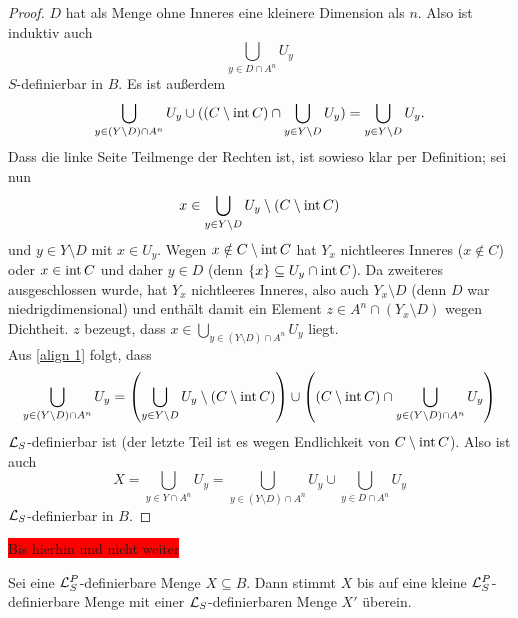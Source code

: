 \begin{proof}
	$D$ hat als Menge ohne Inneres eine kleinere Dimension als $n$. Also ist induktiv auch $$\bigcup\limits_{y\in D\cap A^n}U_y$$ $S$-definierbar in $B$. Es ist außerdem
	\begin{align}\label{align 1}
	\bigcup\limits_{y\in (Y\setminus D)\cap A^n}U_y\cup((C\setminus\operatorname{int} C)\cap\bigcup\limits_{y\in Y\setminus D}U_y)=\bigcup\limits_{y\in Y\setminus D}U_y.
	\end{align}
	Dass die linke Seite Teilmenge der Rechten ist, ist sowieso klar per Definition; sei nun $$x\in\bigcup\limits_{y\in Y\setminus D}U_y\setminus (C\setminus\operatorname{int} C)$$ und $y\in Y\setminus D$ mit $x\in U_y$. Wegen $x\notin C\setminus\operatorname{int} C$ hat $Y_x$ nichtleeres Inneres ($x\notin C$) oder $x\in\operatorname{int} C$ und daher $y\in D$ (denn $\{x\}\subseteq U_y\cap\operatorname{int} C$). Da zweiteres ausgeschlossen wurde, hat $Y_x$ nichtleeres Inneres, also auch $Y_x\setminus D$ (denn $D$ war niedrigdimensional) und enthält damit ein Element $z\in A^n\cap(Y_x\setminus D)$ wegen Dichtheit. $z$ bezeugt, dass $x\in\bigcup\limits_{y\in (Y\setminus D)\cap A^n}U_y$ liegt.\\
	Aus \ref{align 1} folgt, dass $$\bigcup\limits_{y\in (Y\setminus D)\cap A^n}U_y=\left(\bigcup\limits_{y\in Y\setminus D}U_y\setminus(C\setminus\operatorname{int} C)\right)\cup\left((C\setminus\operatorname{int} C)\cap\bigcup\limits_{y\in (Y\setminus D)\cap A^n}U_y\right)$$ $\mathcal{L}_S$-definierbar ist (der letzte Teil ist es wegen Endlichkeit von $C\setminus\operatorname{int} C$). Also ist auch $$X=\bigcup\limits_{y\in Y\cap A^n}U_y=\bigcup\limits_{y\in (Y\setminus D)\cap A^n}U_y\cup\bigcup\limits_{y\in D\cap A^n}U_y$$ $\mathcal{L}_S$-definierbar in $B$.
\end{proof}
\colorbox{red}{Bis hierhin und nicht weiter}
\begin{theorem}
	Sei eine $\mathcal{L}^P_S$-definierbare Menge $X\subseteq B$. Dann stimmt $X$ bis auf eine kleine $\mathcal{L}^P_S$-definierbare Menge mit einer $\mathcal{L}_S$-definierbaren Menge $X'$ überein.
\end{theorem}

